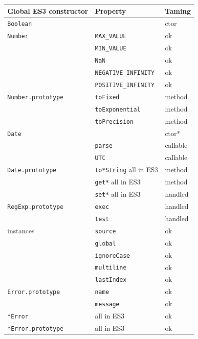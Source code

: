 \documentclass[letterpaper,twocolumn,10pt]{article}
\newcommand{\code}[1]{{\tt {#1}}}              %
\begin{document}
\begin{figure}
\begin{tabular}{lll}
  Global ES3 constructor  & Property                    & Taming \\
  \hline 
  \code{Boolean}          &                             & ctor \\
  \hline
  \code{Number}           & \code{MAX\_VALUE}           & ok \\
                          & \code{MIN\_VALUE}           & ok \\
                          & \code{NaN}                  & ok \\
                          & \code{NEGATIVE\_INFINITY}   & ok \\
                          & \code{POSITIVE\_INFINITY}   & ok \\
  \code{Number.prototype} & \code{toFixed}              & method \\
                          & \code{toExponential}        & method \\
                          & \code{toPrecision}          & method \\
  \hline
  \code{Date}             &                             & ctor* \\
                          & \code{parse}                & callable \\
                          & \code{UTC}                  & callable \\
  \code{Date.prototype}   & \code{to*String} all in ES3 & method \\
                          & \code{get*}      all in ES3 & method \\
                          & \code{set*}      all in ES3 & handled \\
  \hline
  \code{RegExp.prototype} & \code{exec}                 & handled \\
                          & \code{test}                 & handled \\
  instances               & \code{source}               & ok \\
                          & \code{global}               & ok \\
                          & \code{ignoreCase}           & ok \\
                          & \code{multiline}            & ok \\
                          & \code{lastIndex}            & ok \\
  \hline 
  \code{Error.prototype}  & \code{name}                 & ok \\
                          & \code{message}              & ok \\
  \code{*Error}           &                  all in ES3 & ok \\
  \code{*Error.prototype} &                  all in ES3 & ok \\
  

\end{tabular}
\end{figure}
\end{document}

